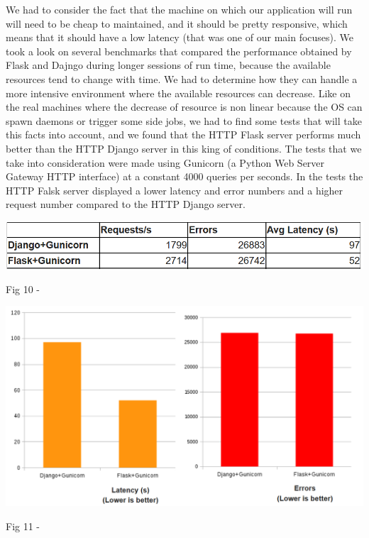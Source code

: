 \documentclass[12pt, a4paper]{report}
\begin{document}
We had to consider the fact that the machine on which our application will run will need to be cheap to maintained, and it should be pretty responsive, which means that it should have a low latency (that was one of our main focuses). We took a look on several benchmarks that compared the performance obtained by Flask and Dajngo during longer sessions of run time, because the available resources tend to change with time. We had to determine how they can handle a more intensive environment where the available resources can decrease. Like on the real machines where the decrease of resource is non linear because the OS can spawn daemons or trigger some side jobs, we had to find some tests that will take this facts into account, and we found that the HTTP Flask server performs much better than the HTTP Django server in this king of conditions. The tests that we take into consideration \cite{Flask2} were made using Gunicorn (a Python Web Server Gateway HTTP interface) at a constant 4000 queries per seconds. In the tests the HTTP Falsk server displayed a lower latency and  error numbers and a higher request number compared to the HTTP Django server.
\par 

\bigskip
\includegraphics[scale=0.7, center]{django-flask-table.png}
\begin{center}
Fig 10 - \cite{Flask2}
\end{center}

\medskip
\includegraphics[scale=0.6, center]{django-flask-latency.png}
\begin{center}
Fig 11 - \cite{Flask2}
\end{center}
\end{document}
